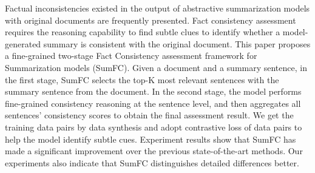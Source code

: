 Factual inconsistencies existed in the output of abstractive summarization models with original documents are frequently presented. Fact consistency assessment requires the reasoning capability to find subtle clues to identify whether a model-generated summary is consistent with the original document. This paper proposes a fine-grained two-stage Fact Consistency assessment framework for Summarization models (SumFC). Given a document and a summary sentence, in the first stage, SumFC selects the top-K most relevant sentences with the summary sentence from the document. In the second stage, the model performs fine-grained consistency reasoning at the sentence level, and then aggregates all sentences' consistency scores to obtain the final assessment result. We get the training data pairs by data synthesis and adopt contrastive loss of data pairs to help the model identify subtle cues. Experiment results show that SumFC has made a significant improvement over the previous state-of-the-art methods. Our experiments also indicate that SumFC distinguishes detailed differences better.
